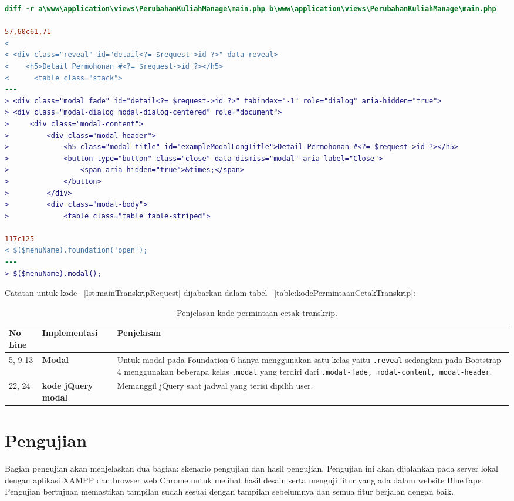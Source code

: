 \begin{lstlisting}[language=diff, caption=Perubahan file \path{\views\PerubahanKuliahManage\main.php},  basicstyle=\ttfamily, frame=single,
columns=fullflexible, keepspaces=true, breaklines=true, label={lst:mainPerubahanKuliahManage}]
diff -r a\www\application\views\PerubahanKuliahManage\main.php b\www\application\views\PerubahanKuliahManage\main.php

57,60c61,71
< 
< <div class="reveal" id="detail<?= $request->id ?>" data-reveal>
<    <h5>Detail Permohonan #<?= $request->id ?></h5>
<      <table class="stack">
---
> <div class="modal fade" id="detail<?= $request->id ?>" tabindex="-1" role="dialog" aria-hidden="true">
> <div class="modal-dialog modal-dialog-centered" role="document">
>     <div class="modal-content">
>         <div class="modal-header">
>             <h5 class="modal-title" id="exampleModalLongTitle">Detail Permohonan #<?= $request->id ?></h5>
>             <button type="button" class="close" data-dismiss="modal" aria-label="Close">
>                 <span aria-hidden="true">&times;</span>
>             </button>
>         </div>
>         <div class="modal-body">
>             <table class="table table-striped">

117c125
< $($menuName).foundation('open');
---
> $($menuName).modal();
\end{lstlisting}

\noindent Catatan untuk kode ~\ref{lst:mainTranskripRequest} dijabarkan dalam tabel ~\ref{table:kodePermintaanCetakTranskrip}:
\begin{table}[H]
	\centering
	\caption{Penjelasan kode permintaan cetak transkrip.}
	\begin{tabularx}{\textwidth}{llX}
		\toprule
		No Line & Implementasi     & Penjelasan\\
		\midrule
		5, 9-13 & \textbf{Modal} & Untuk modal pada Foundation 6 hanya menggunakan satu kelas yaitu \texttt{.reveal} sedangkan pada Bootstrap 4 menggunakan beberapa kelas \texttt{.modal} yang terdiri dari \texttt{.modal-fade, modal-content, modal-header}.\\
		22, 24 & \textbf{kode jQuery modal}  & Memanggil jQuery saat jadwal yang terisi dipilih user.\\		
		\bottomrule
	\end{tabularx}%
	\label{table:modal}
\end{table}




\section{Pengujian}
Bagian pengujian akan menjelaskan dua bagian: skenario pengujian dan hasil pengujian. Pengujian ini akan dijalankan pada server lokal dengan aplikasi XAMPP dan browser web Chrome untuk melihat hasil desain serta menguji fitur yang ada dalam website BlueTape. Pengujian bertujuan memastikan tampilan sudah sesuai dengan tampilan sebelumnya dan semua fitur berjalan dengan baik.
